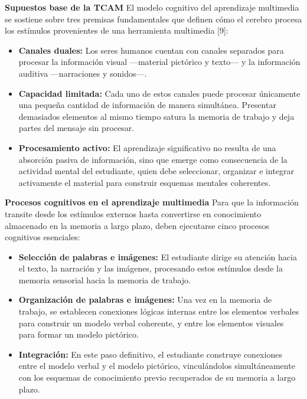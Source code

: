 \documentclass[11pt]{article}
\begin{document}
\textbf{Supuestos base de la TCAM}
El modelo cognitivo del aprendizaje multimedia se sostiene sobre tres premisas fundamentales que definen cómo el cerebro procesa los estímulos provenientes de una herramienta multimedia [9]:
\begin{itemize}
    \item \textbf{Canales duales:} Los seres humanos cuentan con canales separados para procesar la información visual —material pictórico y texto— y la información auditiva —narraciones y sonidos—.
    \item \textbf{Capacidad limitada:} Cada uno de estos canales puede procesar únicamente una pequeña cantidad de información de manera simultánea. Presentar demasiados elementos al mismo tiempo satura la memoria de trabajo y deja partes del mensaje sin procesar.
    \item \textbf{Procesamiento activo:} El aprendizaje significativo no resulta de una absorción pasiva de información, sino que emerge como consecuencia de la actividad mental del estudiante, quien debe seleccionar, organizar e integrar activamente el material para construir esquemas mentales coherentes.
\end{itemize}

\textbf{Procesos cognitivos en el aprendizaje multimedia}
Para que la información transite desde los estímulos externos hasta convertirse en conocimiento almacenado en la memoria a largo plazo, deben ejecutarse cinco procesos cognitivos esenciales:
\begin{itemize}
    \item \textbf{Selección de palabras e imágenes:} El estudiante dirige su atención hacia el texto, la narración y las imágenes, procesando estos estímulos desde la memoria sensorial hacia la memoria de trabajo.
    \item \textbf{Organización de palabras e imágenes:} Una vez en la memoria de trabajo, se establecen conexiones lógicas internas entre los elementos verbales para construir un modelo verbal coherente, y entre los elementos visuales para formar un modelo pictórico.
    \item \textbf{Integración:} En este paso definitivo, el estudiante construye conexiones entre el modelo verbal y el modelo pictórico, vinculándolos simultáneamente con los esquemas de conocimiento previo recuperados de su memoria a largo plazo.
\end{itemize}
\end{document}
